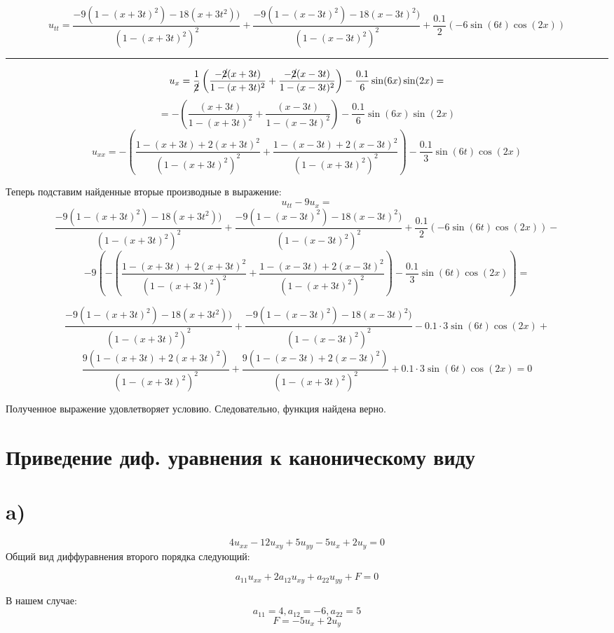 \documentclass[a4paper,12pt]{article}
\begin{document}
	\[
		u_{tt} = \frac{-9(1-(x+3t)^2) - 18(x+3t^2))}{(1-(x+3t)^2)^2} + \frac{-9(1-(x-3t)^2) -18(x-3t)^2)}{(1-(x-3t)^2)^2} + \frac{0.1}{2}(-6\sin(6t)\cos(2x))
	\]
	
\begin{center}
	\rule{0.8\linewidth}{1pt}
\end{center}
	\[
		u_x = \frac{1}{\cancel{2}}\left(\frac{-\cancel{2}(x+3t)}{1-(x+3t)^2} + \frac{-\cancel{2}(x-3t)}{1-(x-3t)^2}\right) - \frac{0.1}{6}\sin(6x)\sin(2x) =
	\]
	\[
		= -\left(\frac{(x+3t)}{1-(x+3t)^2} + \frac{(x-3t)}{1-(x-3t)^2}\right) - \frac{0.1}{6}\sin(6x)\sin(2x) 
	\]
	\[
		u_{xx} = -\left(\frac{1-(x+3t) + 2(x+3t)^2}{(1-(x+3t)^2)^2} + \frac{1-(x-3t) + 2(x-3t)^2}{(1-(x+3t)^2)^2}\right) - \frac{0.1}{3}\sin(6t)\cos(2x)
	\]
	
	Теперь подставим найденные вторые производные в выражение:
	\[
		u_{tt} - 9u_{x} = 
	\]
	\[
	 \frac{-9(1-(x+3t)^2) - 18(x+3t^2))}{(1-(x+3t)^2)^2} + \frac{-9(1-(x-3t)^2) -18(x-3t)^2)}{(1-(x-3t)^2)^2} + \frac{0.1}{2}(-6\sin(6t)\cos(2x)) - 
	\]
	\[
		-9\left( -\left(\frac{1-(x+3t) + 2(x+3t)^2}{(1-(x+3t)^2)^2} + \frac{1-(x-3t) + 2(x-3t)^2}{(1-(x+3t)^2)^2}\right) - \frac{0.1}{3}\sin(6t)\cos(2x)\right) = 
	\]

	\[
	\frac{-9(1-(x+3t)^2) - 18(x+3t^2))}{(1-(x+3t)^2)^2} + \frac{-9(1-(x-3t)^2) -18(x-3t)^2)}{(1-(x-3t)^2)^2} - {0.1}\cdot3\sin(6t)\cos(2x) +
	\]
	\[
	\frac{9(1-(x+3t) + 2(x+3t)^2)}{(1-(x+3t)^2)^2} + \frac{9(1-(x-3t) + 2(x-3t)^2)}{(1-(x+3t)^2)^2} + 0.1\cdot3\sin(6t)\cos(2x) = 0
	\]
	
	Полученное выражение удовлетворяет условию. Следовательно, функция найдена верно.
	\newpage
	\section{Приведение диф. уравнения к каноническому виду}
	\section*{a)}
	\[
		4u_{xx} - 12u_{xy} + 5u_{yy} - 5u_x + 2u_y = 0
	\]
	Общий вид диффуравнения второго порядка следующий:
		\begin{mdframed}
		\[
		 a_{11} u_{xx} + 2a_{12}u_{xy} + a_{22}u_{yy} + F = 0
		\]
	\end{mdframed}
	В нашем случае:
	\[
		a_{11} = 4, a_{12} = -6, a_{22} = 5
	\]
	\[
		F = - 5u_x + 2u_y 
	\]
	
\end{document}
